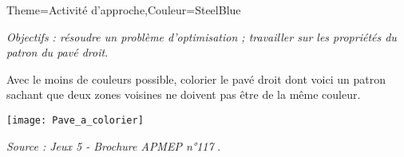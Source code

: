\begin{Maquette}[Cours]{Theme={Activité d'approche},Couleur={SteelBlue}}


      {\it Objectifs : résoudre un problème d'optimisation ; travailler sur les propriétés du patron du pavé droit.}

      \begin{AActivite}

         Avec le moins de couleurs possible, colorier le pavé droit dont voici un patron sachant que deux zones voisines ne doivent pas être de la même couleur.
         \begin{center}
            \texttt{[image: Pave\_a\_colorier]}
         \end{center}

      \end{AActivite}

      \vfill\hfill{\it\footnotesize Source : \og Jeux 5 - Brochure APMEP n°117 \fg}.

\end{Maquette}


